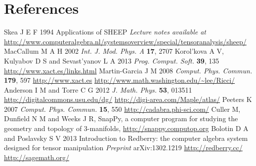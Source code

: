 \documentclass[a4paper]{jpconf}
\begin{document}
 



\section*{References}
\begin{thebibliography}{10}
Skea J E F 1994 Applications of SHEEP {\it Lecture notes available at}
\url{
http://www.computeralgebra.nl/systemsoverview/special/tensoranalysis/sheep/}
MacCallum M A H 2002 {\it Int. J. Mod. Phys. A} {\bf 17}, 2707 
Korol'kova A V, Kulyabov D S and Sevast'yanov L A 2013 {\it Prog. Comput. Soft.} 
{\bf 39}, 135
\url{http://www.xact.es/links.html}
Martin-Garcia J M 2008 {\it Comput. Phys. Commun.} {\bf 179}, 597
\url{http://www.xact.es}
\url{http://www.math.washington.edu/~lee/Ricci/}
Anderson I M and Torre C G 2012 {\it J. Math. Phys.} {\bf 53}, 013511
\url{http://digitalcommons.usu.edu/dg/}
\url{http://digi-area.com/Maple/atlas/}
Peeters K 2007 {\it Comput. Phys. Commun.} {\bf 15}, 550
\url{http://cadabra.phi-sci.com/}
Culler M, Dunfield N M and Weeks J R, SnapPy, a computer program for studying the geometry and topology of 3-manifolds, \url{http://snappy.computop.org}
Bolotin D A and Poslavsky S V 2013 Introduction to Redberry: the computer algebra system designed for tensor manipulation {\it Preprint} arXiv:1302.1219
\url{http://redberry.cc/}
\url{http://sagemath.org/}

\end{thebibliography}
\end{document}
